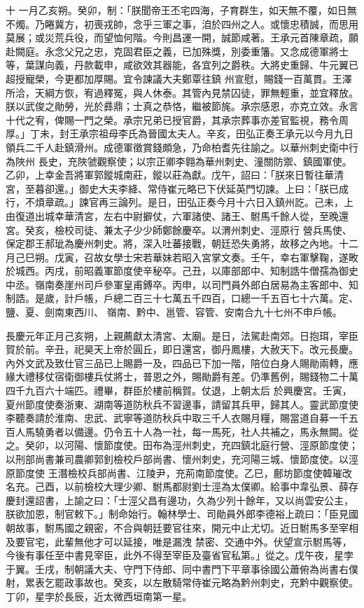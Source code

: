 \begin{pinyinscope}
 十
 一月乙亥朔。癸卯，制：「朕聞帝王丕宅四海，子育群生，如天無不覆，如日無不燭。乃睠冀方，初喪戎帥，念乎三軍之事，洎於四州之人。或懷忠積誠，而思用莫展；或災荒兵役，而望恤何階。今則昌運一開，誠節咸著。王承元首陳章疏，願赴闕庭。永念父兄之忠，克固君臣之義，已加殊獎，別委重籓。又念成德軍將士等，葉謀向義，丹款載申，咸欲效其器能，各宜列之爵秩。大將史重歸、牛元翼已超授寵榮，今更都加厚賜。宜令諫議大夫鄭覃往鎮
 州宣慰，賜錢一百萬貫。王澤所洽，天綱方恢，宥過釋冤，與人休泰。其管內見禁囚徒，罪無輕重，並宜釋放。朕以武俊之勛勞，光於彞鼎；士真之恭恪，繼被節旄。承宗感恩，亦克立效。永言十代之宥，俾賜一門之榮。承宗兄弟已授官爵，其承宗葬事亦差官監視，務令周厚。」丁未，封王承宗祖母李氏為晉國太夫人。辛亥，田弘正奏王承元以今月九日領兵二千人赴鎮滑州。成德軍徵賞錢頗急，乃命柏耆先往諭之。以華州刺史衛中行為陜州
 長史，充陜虢觀察使；以宗正卿李翱為華州刺史、潼關防禦、鎮國軍使。乙卯，上幸金吾將軍郭鏦城南莊，鏦以莊為獻。戊午，詔曰：「朕來日暫往華清宮，至暮卻還。」御史大夫李絳、常侍崔元略已下伏延英門切諫。上曰：「朕已成行，不煩章疏。」諫官再三論列。是日，田弘正奏今月十六日入鎮州訖。己未，上由復道出城幸華清宮，左右中尉擗仗，六軍諸使、諸王、駙馬千餘人從，至晚還宮。癸亥，檢校司徒、兼太子少少師鄭餘慶卒。以渭州刺史、涇原行
 營兵馬使、保定郡王郝玼為慶州刺史。將，深入吐蕃接戰，朝廷恐失勇將，故移之內地。十二月己巳朔。戊寅，召故女學士宋若華妹若昭入宮掌文奏。壬午，幸右軍擊鞠，遂畋於城西。丙戌，前昭義軍節度使辛秘卒。己丑，以庫部郎中、知制誥牛僧孺為御史中丞。嶺南奏崖州司戶參軍皇甫鎛卒。丙申，以司門員外郎白居易為主客郎中、知制誥。是歲，計戶帳，戶總二百三十七萬五千四百，口總一千五百七十六萬。定、鹽、夏、劍南東西川、
 嶺南、黔中、邕管、容管、安南合九十七州不申戶帳。



 長慶元年正月己亥朔，上親薦獻太清宮、太廟。是日，法駕赴南郊。日抱珥，宰臣賀於前。辛丑，祀昊天上帝於圓丘，即日還宮，御丹鳳樓，大赦天下。改元長慶。內外文武及致仕官三品已上賜爵一及，四品已下加一階，陪位白身人賜勛兩轉，應緣大禮移仗宿衛御樓兵仗將士，普恩之外，賜勛爵有差。仍準舊例，賜錢物二十萬四千九百六十端匹。禮畢，群臣於樓前稱賀。仗退，上朝太后
 於興慶宮。壬寅，夏州節度使奏浙東、湖南等道防秋兵不習邊事，請留其兵甲，歸其人。靈武節度使李聽奏請於淮南、忠武、武寧等道防秋兵中取三千人衣賜月糧，賜當道自募一千五百人馬驍勇者以備邊。仍令五十人為一社，每一馬死，社人共補之，馬永無闕。從之。癸卯，以河陽、懷節度使。田布為涇州刺史，充四鎮北庭行營、涇原節度使；以刑部尚書兼司農卿郭釗檢校戶部尚書、懷州刺史，充河陽三城、懷節度使。以涇原節度使
 王潛檢校兵部尚書、江陵尹，充荊南節度使。乙巳，鄜坊節度使韓璀改名充。己酉，以前檢校大理少卿、駙馬都尉劉士涇為太僕卿。給事中韋弘景、薛存慶封還詔書，上諭之曰：「士涇父昌有邊功，久為少列十餘年，又以尚雲安公主，朕欲加恩，制官敕下。」制命始行。翰林學士、司勛員外郎李德裕上疏曰：「臣見國朝故事，駙馬國之親密，不合與朝廷要官往來，開元中止尤切。近日駙馬多至宰相及要官宅，此輩無他才可以延接，唯是漏洩
 禁密、交通中外。伏望宣示駙馬等，今後有事任至中書見宰臣，此外不得至宰臣及臺省官私第。」從之。戊午夜，星孛于翼。壬戌，制朝議大夫、守門下侍郎、同中書門下平章事徐國公蕭俯為尚書右僕射，累表乞罷政事故也。癸亥，以左散騎常侍崔元略為黔州刺史，充黔中觀察使。丁卯，星孛於長辰，近太微西垣南第一星。




\end{pinyinscope}
